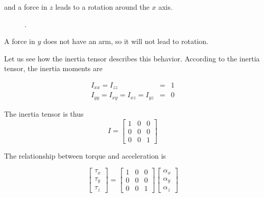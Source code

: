 and a force in $z$ leads to a rotation around the $x$ axis. 

\begin{figure}
  \begin{center}
  \end{center}
  \caption[]{.}
  \label{fig:tensor14}
\end{figure}

A force in $y$ does not have an arm, so it will not lead to rotation. 

Let us see how the inertia tensor describes this behavior. According to the inertia tensor, the inertia moments are 

\begin{eqnarray}
I_{xx} =I_{zz} &=& 1\\
I_{yy} = I_{xy} = I_{xz} = I_{yz} &=& 0 
\end{eqnarray}

The inertia tensor is thus 
\begin{equation}
I=\left[\begin{array}{ccc}
1 & 0 & 0 \\
0 & 0 & 0 \\
0 & 0 & 1
\end{array}\right] 
\end{equation}

The relationship between torque and acceleration is 


\begin{equation}
\left[\begin{array}{c}
\tau_x\\
\tau_y\\
\tau_z
\end{array}\right] = \left[\begin{array}{ccc}
1 & 0 & 0 \\
0 & 0 & 0 \\
0 & 0 & 1
\end{array}\right] 
\left[\begin{array}{c}
\alpha_x\\
\alpha_y\\
\alpha_z
\end{array}\right] 
\end{equation}

